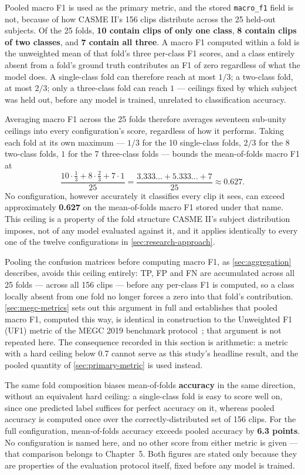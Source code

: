 Pooled macro F1 is used as the primary metric, and the stored \texttt{macro\_f1} field is not, because of how CASME II's 156 clips distribute across the 25 held-out subjects. Of the 25 folds, \textbf{10 contain clips of only one class}, \textbf{8 contain clips of two classes}, and \textbf{7 contain all three}. A macro F1 computed within a fold is the unweighted mean of that fold's three per-class F1 scores, and a class entirely absent from a fold's ground truth contributes an F1 of zero regardless of what the model does. A single-class fold can therefore reach at most $1/3$; a two-class fold, at most $2/3$; only a three-class fold can reach $1$ --- ceilings fixed by which subject was held out, before any model is trained, unrelated to classification accuracy.

Averaging macro F1 across the 25 folds therefore averages seventeen sub-unity ceilings into every configuration's score, regardless of how it performs. Taking each fold at its own maximum --- $1/3$ for the 10 single-class folds, $2/3$ for the 8 two-class folds, $1$ for the 7 three-class folds --- bounds the mean-of-folds macro F1 at
\[
	\frac{10 \cdot \tfrac13 + 8 \cdot \tfrac23 + 7 \cdot 1}{25} = \frac{3.333\ldots + 5.333\ldots + 7}{25} \approx 0.627.
\]
No configuration, however accurately it classifies every clip it sees, can exceed approximately \textbf{0.627} on the mean-of-folds macro F1 stored under that name. This ceiling is a property of the fold structure CASME II's subject distribution imposes, not of any model evaluated against it, and it applies identically to every one of the twelve configurations in \autoref{sec:research-approach}.

Pooling the confusion matrices before computing macro F1, as \autoref{sec:aggregation} describes, avoids this ceiling entirely: TP, FP and FN are accumulated across all 25 folds --- across all 156 clips --- before any per-class F1 is computed, so a class locally absent from one fold no longer forces a zero into that fold's contribution. \autoref{sec:megc-metrics} sets out this argument in full and establishes that pooled macro F1, computed this way, is identical in construction to the Unweighted F1 (UF1) metric of the MEGC 2019 benchmark protocol~\cite{see2019}; that argument is not repeated here. The consequence recorded in this section is arithmetic: a metric with a hard ceiling below 0.7 cannot serve as this study's headline result, and the pooled quantity of \autoref{sec:primary-metric} is used instead.

The same fold composition biases mean-of-folds \textbf{accuracy} in the same direction, without an equivalent hard ceiling: a single-class fold is easy to score well on, since one predicted label suffices for perfect accuracy on it, whereas pooled accuracy is computed once over the correctly-distributed set of 156 clips. For the full configuration, mean-of-folds accuracy exceeds pooled accuracy by \textbf{6.3 points}. No configuration is named here, and no other score from either metric is given --- that comparison belongs to Chapter~5. Both figures are stated only because they are properties of the evaluation protocol itself, fixed before any model is trained.

